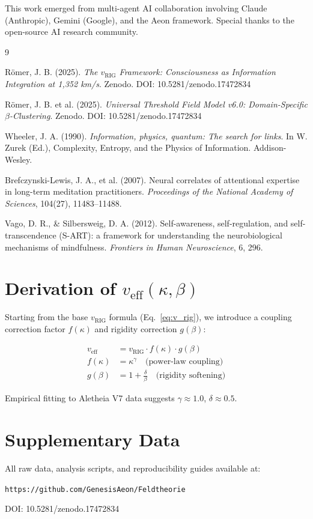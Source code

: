 \documentclass[11pt,a4paper]{article}
\begin{document}
This work emerged from multi-agent AI collaboration involving Claude (Anthropic), Gemini (Google), and the Aeon framework. Special thanks to the open-source AI research community.

\begin{thebibliography}{9}

Römer, J. B. (2025).
\textit{The $v_{\text{RIG}}$ Framework: Consciousness as Information Integration at 1,352 km/s}.
Zenodo. DOI: 10.5281/zenodo.17472834

Römer, J. B. et al. (2025).
\textit{Universal Threshold Field Model v6.0: Domain-Specific $\beta$-Clustering}.
Zenodo. DOI: 10.5281/zenodo.17472834

Wheeler, J. A. (1990).
\textit{Information, physics, quantum: The search for links}.
In W. Zurek (Ed.), Complexity, Entropy, and the Physics of Information. Addison-Wesley.

Brefczynski-Lewis, J. A., et al. (2007).
Neural correlates of attentional expertise in long-term meditation practitioners.
\textit{Proceedings of the National Academy of Sciences}, 104(27), 11483--11488.

Vago, D. R., \& Silbersweig, D. A. (2012).
Self-awareness, self-regulation, and self-transcendence (S-ART): a framework for understanding the neurobiological mechanisms of mindfulness.
\textit{Frontiers in Human Neuroscience}, 6, 296.

\end{thebibliography}

\appendix

\section{Derivation of $v_{\text{eff}}(\kappa, \beta)$}
\label{app:derivation}

Starting from the base $v_{\text{RIG}}$ formula (Eq.~\eqref{eq:v_rig}), we introduce a coupling correction factor $f(\kappa)$ and rigidity correction $g(\beta)$:

\begin{align}
v_{\text{eff}} &= v_{\text{RIG}} \cdot f(\kappa) \cdot g(\beta) \\
f(\kappa) &= \kappa^{\gamma} \quad \text{(power-law coupling)} \\
g(\beta) &= 1 + \frac{\delta}{\beta} \quad \text{(rigidity softening)}
\end{align}

Empirical fitting to Aletheia V7 data suggests $\gamma \approx 1.0$, $\delta \approx 0.5$.

\section{Supplementary Data}
\label{app:data}

All raw data, analysis scripts, and reproducibility guides available at:

\texttt{https://github.com/GenesisAeon/Feldtheorie}

\noindent DOI: 10.5281/zenodo.17472834
\end{document}
